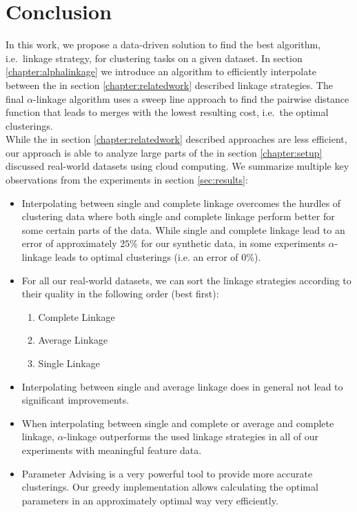 \chapter{Conclusion}

In this work, we propose a data-driven solution to find the best algorithm, i.e.\ linkage strategy, for clustering tasks on a given dataset. In section \ref{chapter:alphalinkage} we introduce an algorithm to efficiently interpolate between the in section \ref{chapter:relatedwork} described linkage strategies. The final $\alpha$-linkage algorithm uses a sweep line approach to find the pairwise distance function that leads to merges with the lowest resulting cost, i.e.\ the optimal clusterings.\\

While the in section \ref{chapter:relatedwork} described approaches are less efficient, our approach is able to analyze large parts of the in section \ref{chapter:setup}  discussed real-world datasets using cloud computing. We summarize multiple key observations from the experiments in section \ref{sec:results}:
\begin{itemize}
\item Interpolating between single and complete linkage overcomes the hurdles of clustering data where both single and complete linkage perform better for some certain parts of the data. While single and complete linkage lead to an error of approximately $25\%$ for our synthetic data, in some experiments $\alpha$-linkage leads to optimal clusterings (i.e. an error of $0\%$).
\item For all our real-world datasets, we can sort the linkage strategies according to their quality in the following order (best first):
\begin{enumerate}
\item Complete Linkage
\item Average Linkage
\item Single Linkage
\end{enumerate}
\item Interpolating between single and average linkage does in general not lead to significant improvements.
\item When interpolating between single and complete or average and complete linkage, $\alpha$-linkage outperforms the used linkage strategies in all of our experiments with meaningful feature data.
\item Parameter Advising is a very powerful tool to provide more accurate clusterings. Our greedy implementation allows calculating the optimal parameters in an approximately optimal way very efficiently.
\end{itemize}


